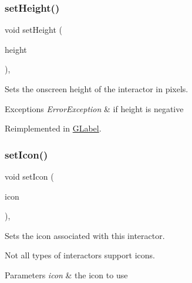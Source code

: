 \mbox{\label{classsgl_1_1GInteractor_a9e280bfc4544dfaf8e4376c4e1a74357}} 
\subsubsection{\texorpdfstring{set\+Height()}{setHeight()}}
{\footnotesize\ttfamily void set\+Height (\begin{DoxyParamCaption}\item[{double}]{height }\end{DoxyParamCaption})\hspace{0.3cm}{\ttfamily [virtual]}, {\ttfamily [inherited]}}



Sets the onscreen height of the interactor in pixels. 


\begin{DoxyExceptions}{Exceptions}
{\em Error\+Exception} & if height is negative \\
\hline
\end{DoxyExceptions}


Reimplemented in \mbox{\hyperlink{classsgl_1_1GLabel_a5eead864d1249c4406f32f9944ed1503}{G\+Label}}.

\mbox{\label{classsgl_1_1GInteractor_a542abfcd7261751352af129c7215ecda}} 
\subsubsection{\texorpdfstring{set\+Icon()}{setIcon()}\hspace{0.1cm}{\footnotesize\ttfamily [1/3]}}
{\footnotesize\ttfamily void set\+Icon (\begin{DoxyParamCaption}\item[{const Q\+Icon \&}]{icon }\end{DoxyParamCaption})\hspace{0.3cm}{\ttfamily [virtual]}, {\ttfamily [inherited]}}



Sets the icon associated with this interactor. 

Not all types of interactors support icons. 
\begin{DoxyParams}{Parameters}
{\em icon} & the icon to use \\
\hline
\end{DoxyParams}


